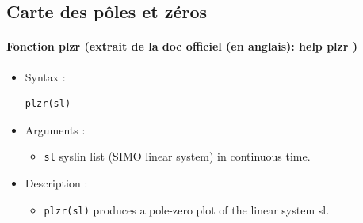 \subsection{Carte des pôles et zéros}

\begin{doc}                                                                       
\paragraph{Fonction plzr (extrait de la doc officiel (en anglais): help plzr )}   
\begin{itemize}                                                                   
    \item Syntax :                                                                
    \begin{code}                                                                  
\begin{verbatim}                                                                  
plzr(sl)                                                                          
\end{verbatim}                                                                    
    \end{code}                                                                    
    \item Arguments :                                                             
    \begin{itemize}                                                               
        \item \verb?sl? syslin list (SIMO linear system) in continuous time.      
    \end{itemize}                                                                 
    \item Description :                                                           
                                                                                  
    \begin{itemize}                                                               
        \item \verb?plzr(sl)? produces a pole-zero plot of the linear system sl.  
    \end{itemize}                                                                 
\end{itemize}                                                                     
                                                                                  
\end{doc}                                                                         

